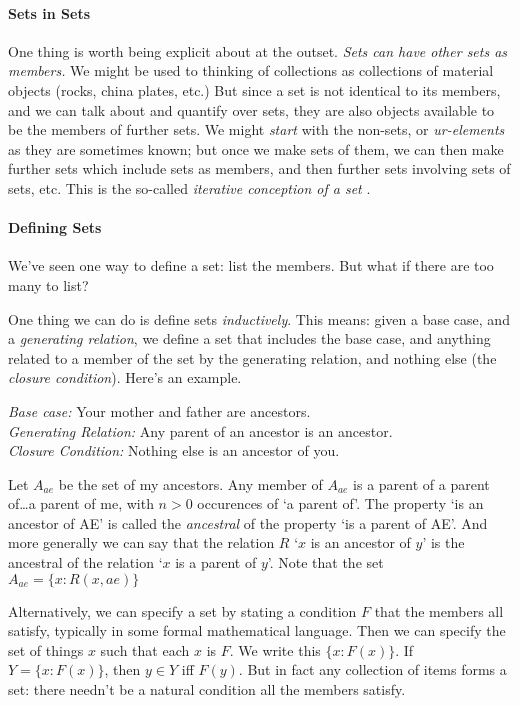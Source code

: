 \paragraph{Sets in Sets} One thing is worth being explicit about at the outset. \emph{Sets can have other sets as members.} We might be used to thinking of collections as collections of material objects (rocks, china plates, etc.) But since a set is not identical to its members, and we can talk about and quantify over sets, they are also objects available to be the members of further sets. We might \emph{start} with the non-sets, or \emph{ur-elements} as they are sometimes known; but once we make sets of them, we can then make further sets which include sets as members, and then further sets involving sets of sets, etc. This is the so-called \emph{iterative conception of a set} \citep{boolos}.


\paragraph{Defining Sets}

We've seen one way to define a set: list the members. But what if there are too many to list? 

One thing we can do is define sets \emph{inductively}. This means: given a base case, and a \emph{generating relation}, we define a set that includes the base case, and anything related to a member of the set by the generating relation, and   nothing else (the \emph{closure condition}). Here's an example. \begin{definition} 
   \emph{Base case:} Your mother and father are ancestors.\\ \emph{Generating Relation:} Any parent of an ancestor is an ancestor.\\ \emph{Closure Condition:} Nothing else is an ancestor of you.
 \end{definition}

Let $A_{ae}$ be the set of my ancestors. Any member of $A_{ae}$ is a parent of a parent of\ldots a parent of me, with $n >0$ occurences of `a parent of'. The property `is an ancestor of AE' is called the \emph{ancestral} of the property `is a parent of AE'. And more generally we can say that the relation $R$ `$x$ is an ancestor of $y$' is the ancestral of the relation `$x$ is a parent of $y$'. Note that the set $A_{ae} = \{x: R(x,ae)\}$

Alternatively, we can specify a set by stating a condition $F$ that the members all satisfy, typically in some formal mathematical language. Then we can specify the set of things $x$ such that each $x$ is $F$. We write this $\{x: F(x)\}$. If $Y = \{x:F(x)\}$, then $y \in Y$ iff $F(y)$. But in fact any collection of items forms a set: there needn't be a natural condition all the members satisfy.

